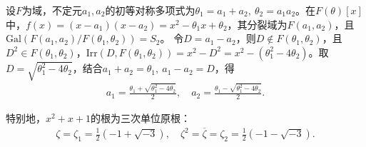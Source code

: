 \documentclass[../../main.tex]{subfiles}%
\begin{document}
\begin{example}
设$F$为域，不定元$a_1,a_2$的初等对称多项式为$\theta_1=a_1+a_2,\ \theta_2=a_1a_2$。在$F(\theta)[x]$中，$f(x)=(x-a_1)(x-a_2)=x^2-\theta_1x+\theta_2$，其分裂域为$F(a_1,a_2)$，且$\mathrm{Gal}(F(a_1,a_2)/F(\theta_1,\theta_2))=S_2$。
令$D=a_1-a_2$，则$D\notin F(\theta_1,\theta_2)$，且$D^2\in F(\theta_1,\theta_2)$，$\mathrm{Irr}(D,F(\theta_1,\theta_2))=x^2-D^2=x^2-(\theta_1^2-4\theta_2)$。取$D=\sqrt{\theta_1^2-4\theta_2}$，结合$a_1+a_2=\theta_1,\ a_1-a_2=D$，得
\begin{align*}
a_1=\frac{\theta_1+\sqrt{\theta_1^2-4\theta_2}}{2},\quad a_2=\frac{\theta_1-\sqrt{\theta_1^2-4\theta_2}}{2}.
\end{align*}

特别地，$x^2+x+1$的根为三次单位原根：
\begin{align*}
\zeta=\zeta_1=\frac{1}{2}(-1+\sqrt{-3}),\quad \zeta^2=\overline{\zeta}=\zeta_2=\frac{1}{2}(-1-\sqrt{-3}).
\end{align*}
\end{example}
\end{document}
